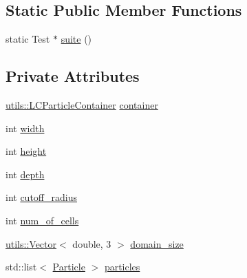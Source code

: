 \subsection*{Static Public Member Functions}
\begin{DoxyCompactItemize}
\item 
static Test $\ast$ \hyperlink{classLCOuterParticleIteratorTest_a605097ed032fa017ae7a00025ef3c5ea}{suite} ()
\end{DoxyCompactItemize}
\subsection*{Private Attributes}
\begin{DoxyCompactItemize}
\item 
\hyperlink{classutils_1_1LCParticleContainer}{utils\-::\-L\-C\-Particle\-Container} \hyperlink{classLCOuterParticleIteratorTest_a70319a9d4b610f52fdcde19837acf4c0}{container}
\item 
int \hyperlink{classLCOuterParticleIteratorTest_a96d9f30988e98be898040163df3cad44}{width}
\item 
int \hyperlink{classLCOuterParticleIteratorTest_a35de94b14ffb7f81395cfba9fa9971f6}{height}
\item 
int \hyperlink{classLCOuterParticleIteratorTest_a5f7049990f80550d96e97ecea2da7b9f}{depth}
\item 
int \hyperlink{classLCOuterParticleIteratorTest_ac43a83d9555b5dd0c96274fa81aeb4e5}{cutoff\-\_\-radius}
\item 
int \hyperlink{classLCOuterParticleIteratorTest_aea461d3938bd39de26d5895a6cc1d133}{num\-\_\-of\-\_\-cells}
\item 
\hyperlink{classutils_1_1Vector}{utils\-::\-Vector}$<$ double, 3 $>$ \hyperlink{classLCOuterParticleIteratorTest_a74f89f909e41cd78b3d1ed13e7a71d59}{domain\-\_\-size}
\item 
std\-::list$<$ \hyperlink{classParticle}{Particle} $>$ \hyperlink{classLCOuterParticleIteratorTest_a77f1f60f85cf5d0350c8949918659b32}{particles}
\end{DoxyCompactItemize}


